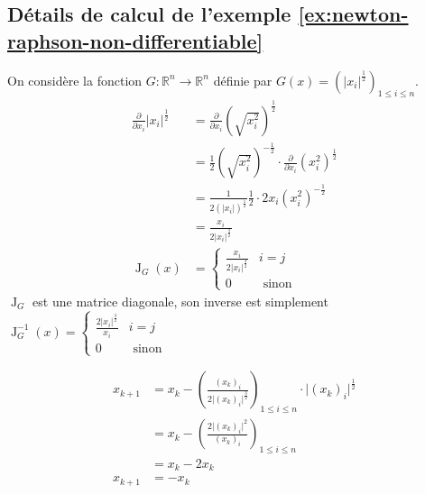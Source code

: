 \documentclass[3p, twocolumn]{elsarticle}
\DeclareMathOperator{\Jacobian}{J}
\begin{document}
\begin{appendices}
    \section{Détails de calcul de l'exemple \ref{ex:newton-raphson-non-differentiable}}
    \label{ap:calcul-exemple-nr}
    On considère la fonction $G:\mathbb R^n\rightarrow \mathbb R^n$ définie par $G(x)=\left(\lvert x_i\rvert^{\frac12}\right)_{1\leq i\leq n}$.
    \begin{align*}
        \frac{\partial}{\partial x_i}\lvert x_i\rvert^{\frac12} & = \frac{\partial}{\partial x_i}\left(\sqrt{x_i^2}\right)^{\frac12}                                          \\
                                                                & = \frac12\left(\sqrt{x_i^2}\right)^{-\frac12}\cdot\frac{\partial}{\partial x_i}\left(x_i^2\right)^{\frac12} \\
                                                                & = \frac1{2(\lvert x_i\rvert)^{\frac12}}\frac12\cdot2x_i(x_i^2)^{-\frac12}                                   \\
                                                                & = \frac{x_i}{2\lvert x_i\rvert^{\frac32}}                                                                   \\
        \Jacobian_G(x)                                          & = \begin{cases}
            \frac{x_i}{2\lvert x_i\rvert^{\frac32}} & i=j             \\
            0                                       & \textrm{ sinon}
        \end{cases}
    \end{align*}
    $\Jacobian_G$ est une matrice diagonale, son inverse est simplement $\Jacobian^{-1}_G(x)=\begin{cases}\frac{2\lvert x_i\rvert^{\frac32}}{x_i}&i=j\\0&\textrm{ sinon}\end{cases}$

    \begin{align*}
        x_{k+1} & = x_k - \left(\frac{(x_k)_i}{2\lvert (x_k)_i\rvert^{\frac32}}\right)_{1\leq i\leq n}\cdot \lvert (x_k)_i\vert ^{\frac12} \\
                & = x_k - \left(\frac{2\lvert (x_k)_i \rvert^{2}}{(x_k)_i}\right)_{1\leq i\leq n}                                          \\
                & = x_k - 2x_k                                                                                                             \\
        x_{k+1} & = - x_k
    \end{align*}

\end{appendices}
\end{document}

